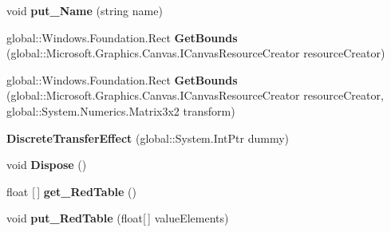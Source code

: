 \begin{DoxyCompactItemize}
void {\bfseries put\+\_\+\+Name} (string name)
\item 
\mbox{\label{class_microsoft_1_1_graphics_1_1_canvas_1_1_effects_1_1_discrete_transfer_effect_a29bc7df704cbb0abd4f3dfa7070a673a}} 
global\+::\+Windows.\+Foundation.\+Rect {\bfseries Get\+Bounds} (global\+::\+Microsoft.\+Graphics.\+Canvas.\+I\+Canvas\+Resource\+Creator resource\+Creator)
\item 
\mbox{\label{class_microsoft_1_1_graphics_1_1_canvas_1_1_effects_1_1_discrete_transfer_effect_a0a5ebcbbad09579e42e05a5c1a687212}} 
global\+::\+Windows.\+Foundation.\+Rect {\bfseries Get\+Bounds} (global\+::\+Microsoft.\+Graphics.\+Canvas.\+I\+Canvas\+Resource\+Creator resource\+Creator, global\+::\+System.\+Numerics.\+Matrix3x2 transform)
\item 
\mbox{\label{class_microsoft_1_1_graphics_1_1_canvas_1_1_effects_1_1_discrete_transfer_effect_a4a58f3e3c50931d7fdf1fd35c5af37e7}} 
{\bfseries Discrete\+Transfer\+Effect} (global\+::\+System.\+Int\+Ptr dummy)
\item 
\mbox{\label{class_microsoft_1_1_graphics_1_1_canvas_1_1_effects_1_1_discrete_transfer_effect_a3892158107b6a2bef81c4e4133f7335a}} 
void {\bfseries Dispose} ()
\item 
\mbox{\label{class_microsoft_1_1_graphics_1_1_canvas_1_1_effects_1_1_discrete_transfer_effect_ad85c790c4323b4f437cf542f2d64fd0f}} 
float \mbox{[}$\,$\mbox{]} {\bfseries get\+\_\+\+Red\+Table} ()
\item 
\mbox{\label{class_microsoft_1_1_graphics_1_1_canvas_1_1_effects_1_1_discrete_transfer_effect_a5a273cab86cd763725f485a7eef1be4c}} 
void {\bfseries put\+\_\+\+Red\+Table} (float\mbox{[}$\,$\mbox{]} value\+Elements)
\item 
\mbox{\label{class_microsoft_1_1_graphics_1_1_canvas_1_1_effects_1_1_discrete_transfer_effect_a7573ded36bbe1fc6645f3a51a329e43b}} 

\end{DoxyCompactItemize}
